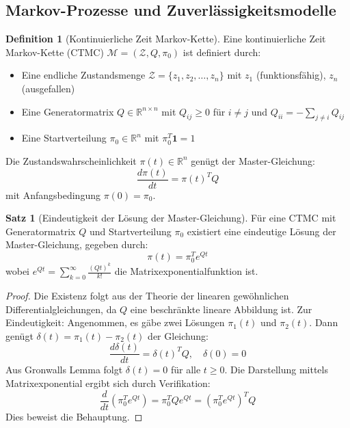 \documentclass[a4paper,11pt]{article}
\theoremstyle{definition}
\newtheorem{definition}{Definition}
\newtheorem{satz}{Satz}
\newenvironment{beweis}{\begin{proof}}{\end{proof}}
\begin{document}
\subsection{Markov-Prozesse und Zuverlässigkeitsmodelle}

\begin{definition}[Kontinuierliche Zeit Markov-Kette]
    \label{def:markov_ctmc}
    Eine kontinuierliche Zeit Markov-Kette (CTMC) $\mathcal{M} = (\mathcal{Z}, Q, \pi_0)$ 
    ist definiert durch:
    \begin{itemize}
        \item Eine endliche Zustandsmenge $\mathcal{Z} = \{z_1, z_2, \ldots, z_n\}$ mit 
              $z_1$ (funktionsfähig), $z_n$ (ausgefallen)
        \item Eine Generatormatrix $Q \in \mathbb{R}^{n \times n}$ mit $Q_{ij} \geq 0$ für $i \neq j$ 
              und $Q_{ii} = -\sum_{j \neq i} Q_{ij}$
        \item Eine Startverteilung $\pi_0 \in \mathbb{R}^n$ mit $\pi_0^T \mathbf{1} = 1$
    \end{itemize}

    Die Zustandswahrscheinlichkeit $\pi(t) \in \mathbb{R}^n$ genügt der Master-Gleichung:
    \[
        \frac{d\pi(t)}{dt} = \pi(t)^T Q
    \]
    mit Anfangsbedingung $\pi(0) = \pi_0$.
\end{definition}

\begin{satz}[Eindeutigkeit der Lösung der Master-Gleichung]
    \label{satz:master_solution}
    Für eine CTMC mit Generatormatrix $Q$ und Startverteilung $\pi_0$ existiert eine eindeutige 
    Lösung der Master-Gleichung, gegeben durch:
    \[
        \pi(t) = \pi_0^T e^{Qt}
    \]
    wobei $e^{Qt} = \sum_{k=0}^{\infty} \frac{(Qt)^k}{k!}$ die Matrixexponentialfunktion ist.

    \begin{beweis}
        Die Existenz folgt aus der Theorie der linearen gewöhnlichen Differentialgleichungen, 
        da $Q$ eine beschränkte lineare Abbildung ist. Zur Eindeutigkeit: Angenommen, es gäbe 
        zwei Lösungen $\pi_1(t)$ und $\pi_2(t)$. Dann genügt $\delta(t) = \pi_1(t) - \pi_2(t)$ 
        der Gleichung:
        \[
            \frac{d\delta(t)}{dt} = \delta(t)^T Q, \quad \delta(0) = 0
        \]
        Aus Gronwalls Lemma folgt $\delta(t) = 0$ für alle $t \geq 0$. Die Darstellung mittels 
        Matrixexponential ergibt sich durch Verifikation: 
        \[
            \frac{d}{dt}(\pi_0^T e^{Qt}) = \pi_0^T Q e^{Qt} = (\pi_0^T e^{Qt})^T Q
        \]
        Dies beweist die Behauptung.
    \end{beweis}
\end{satz}
\end{document}
